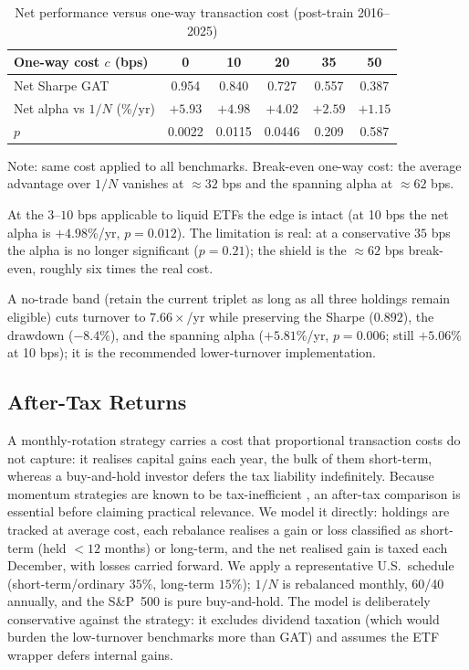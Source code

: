 \begin{table}[H]
\centering
\caption{Net performance versus one-way transaction cost (post-train 2016--2025)}
\label{tab:costs}
\small
\begin{tabular}{lccccc}
\toprule
One-way cost $c$ (bps) & 0 & 10 & 20 & 35 & 50 \\
\midrule
Net Sharpe GAT         & 0.954 & 0.840 & 0.727 & 0.557 & 0.387 \\
Net alpha vs $1/N$ (\%/yr) & $+5.93$ & $+4.98$ & $+4.02$ & $+2.59$ & $+1.15$ \\
$p$                     & 0.0022 & 0.0115 & 0.0446 & 0.209 & 0.587 \\
\bottomrule
\end{tabular}
\begin{flushleft}
\footnotesize
Note: same cost applied to all benchmarks. Break-even one-way cost: the average
advantage over $1/N$ vanishes at $\approx 32$ bps and the spanning alpha at
$\approx 62$ bps.
\end{flushleft}
\end{table}

At the $3$--$10$ bps applicable to liquid ETFs the edge is intact (at 10 bps the
net alpha is $+4.98\%$/yr, $p = 0.012$). The limitation is real: at a
conservative $35$ bps the alpha is no longer significant ($p = 0.21$); the shield
is the $\approx 62$ bps break-even, roughly six times the real cost.

A no-trade band (retain the current triplet as long as all three holdings remain
eligible) cuts turnover to $7.66\times$/yr while preserving the Sharpe ($0.892$),
the drawdown ($-8.4\%$), and the spanning alpha ($+5.81\%$/yr, $p = 0.006$; still
$+5.06\%$ at 10 bps); it is the recommended lower-turnover implementation.

\subsection{After-Tax Returns}
\label{sec:res_tax}

A monthly-rotation strategy carries a cost that proportional transaction costs do
not capture: it realises capital gains each year, the bulk of them
short-term, whereas a buy-and-hold investor defers the tax liability indefinitely.
Because momentum strategies are known to be tax-inefficient
\citep{israel2012, sialm2018}, an after-tax comparison is essential before claiming
practical relevance. We model it directly: holdings are tracked at average cost,
each rebalance realises a gain or loss classified as short-term (held $<12$ months)
or long-term, and the net realised gain is taxed each December, with losses carried
forward. We apply a representative U.S.\ schedule (short-term/ordinary $35\%$,
long-term $15\%$); $1/N$ is rebalanced monthly, 60/40 annually, and the S\&P~500 is
pure buy-and-hold. The model is deliberately conservative against the strategy: it
excludes dividend taxation (which would burden the low-turnover benchmarks more than
GAT) and assumes the ETF wrapper defers internal gains.

